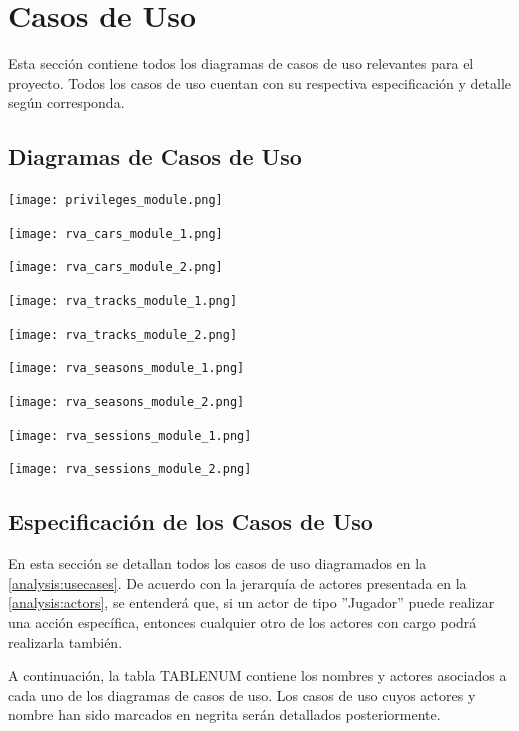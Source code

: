 \newpage

\section{Casos de Uso}
Esta sección contiene todos los diagramas de casos de uso relevantes para el proyecto. Todos los casos de uso cuentan con su respectiva especificación y detalle según corresponda.

\subsection{Diagramas de Casos de Uso}
\label{analysis:usecases}
\texttt{[image: privileges\_module.png]}

\texttt{[image: rva\_cars\_module\_1.png]}

\texttt{[image: rva\_cars\_module\_2.png]}

\texttt{[image: rva\_tracks\_module\_1.png]}

\texttt{[image: rva\_tracks\_module\_2.png]}

\texttt{[image: rva\_seasons\_module\_1.png]}

\texttt{[image: rva\_seasons\_module\_2.png]}

\texttt{[image: rva\_sessions\_module\_1.png]}

\texttt{[image: rva\_sessions\_module\_2.png]}

\subsection{Especificación de los Casos de Uso}
\label{analysis:usecases:specification}
En esta sección se detallan todos los casos de uso diagramados en la \autoref{analysis:usecases}. De acuerdo con la jerarquía de actores presentada en la \autoref{analysis:actors}, se entenderá que, si un actor de tipo ''Jugador'' puede realizar una acción específica, entonces cualquier otro de los actores con cargo podrá realizarla también.

A continuación, la tabla TABLENUM contiene los nombres y actores asociados a cada uno de los diagramas de casos de uso. Los casos de uso cuyos actores y nombre han sido marcados en negrita serán detallados posteriormente.

